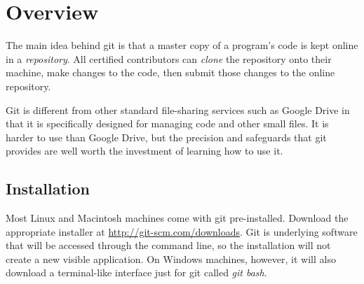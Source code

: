 \label{appendix:setup}


\section*{Overview} %

The main idea behind git is that a master copy of a program's code is kept online in a \emph{repository}.
All certified contributors can \emph{clone} the repository onto their machine, make changes to the code, then submit those changes to the online repository.

Git is different from other standard file-sharing services such as Google Drive in that it is specifically designed for managing code and other small files.
It is harder to use than Google Drive, but the precision and safeguards that git provides are well worth the investment of learning how to use it.

\subsection*{Installation} %

Most Linux and Macintosh machines come with git pre-installed.
Download the appropriate installer at \url{http://git-scm.com/downloads}.
Git is underlying software that will be accessed through the command line, so the installation will not create a new visible application.
On Windows machines, however, it will also download a terminal-like interface just for git called \emph{git bash}.


